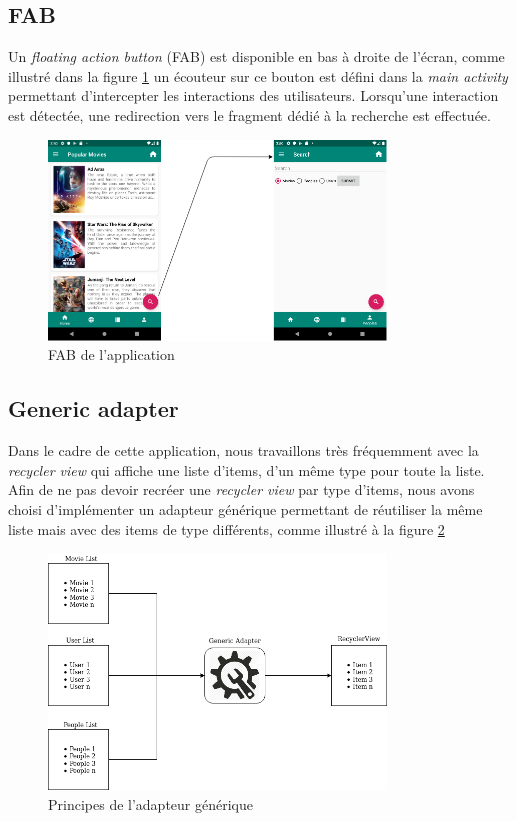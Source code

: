\subsection{FAB}
Un \textit{floating action button} (FAB) est disponible en bas à droite de l'écran, comme illustré dans la figure \ref{fab} un écouteur sur ce bouton est défini dans la \textit{main activity} permettant d'intercepter les interactions des utilisateurs. Lorsqu'une interaction est détectée, une redirection vers le fragment dédié à la recherche est effectuée.
\begin{figure}
    \begin{center}
        \includegraphics[width=0.8\textwidth]{img/schemas/FAB.png}
    \end{center}
    \caption{FAB de l'application}
    \label{fab}
\end{figure}

\subsection{Generic adapter}\label{generic-adapter}
Dans le cadre de cette application, nous travaillons très fréquemment avec la \textit{recycler view} qui affiche une liste d'items, d'un même type pour toute la liste. Afin de ne pas devoir recréer une \textit{recycler view} par type d'items, nous avons choisi d'implémenter un adapteur générique permettant de réutiliser la même liste mais avec des items de type différents, comme illustré à la figure \ref{generic_adapter_img}
\begin{figure}
    \begin{center}
        \includegraphics[width=0.8\textwidth]{img/schemas/Generic_Adapter.png}
    \end{center}
    \caption{Principes de l'adapteur générique}
    \label{generic_adapter_img}
\end{figure}
